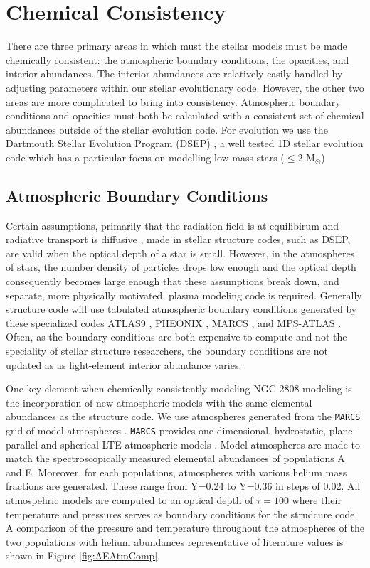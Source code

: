 \section{Chemical Consistency}\label{sec:const}
There are three primary areas in which must the stellar models must be made chemically
consistent: the atmospheric boundary conditions, the opacities, and interior
abundances. The interior abundances are relatively easily handled by adjusting
parameters within our stellar evolutionary code. However, the other two areas are
more complicated to bring into consistency. Atmospheric boundary conditions and
opacities must both be calculated with a consistent set of chemical abundances
outside of the stellar evolution code. For evolution we use the Dartmouth Stellar Evolution Program (DSEP) \citep{Dotter2008}, a well tested 1D stellar evolution code which has a particular focus on modelling low mass stars ($\le 2$ M$_{\odot}$)

\subsection{Atmospheric Boundary Conditions}\label{sec:atm}
Certain assumptions, primarily that the radiation field is at equilibirum and radiative transport is diffusive \citep{Salaris2005}, made in stellar structure
codes, such as DSEP, are valid when the optical depth of a star is small.
However, in the atmospheres of stars, the number density of particles drops low
enough and the optical depth consequently becomes large enough that these
assumptions break down, and separate, more physically motivated, plasma modeling code is required.
Generally structure code will use tabulated atmospheric boundary conditions
generated by these specialized codes ATLAS9 \citep{Kurucz1993}, PHEONIX \citep{Husser2013}, MARCS \citep{Gustafsson2008}, and MPS-ATLAS \citep{Kostogryz2023}. Often, as the boundary conditions are both expensive to compute
and not the speciality of stellar structure researchers, the boundary
conditions are not updated as as light-element interior abundance varies. 

One key element when chemically consistently modeling NGC 2808 modeling is the
incorporation of new atmospheric models with the same elemental abundances as
the structure code. We use atmospheres generated from the \texttt{MARCS} grid
of model atmospheres \citep{Plez2008}. \texttt{MARCS} provides one-dimensional,
hydrostatic, plane-parallel and spherical LTE atmospheric models
\citep{Gustafsson2008}. Model atmospheres are made to match the
spectroscopically measured elemental abundances of populations A and E.
Moreover, for each populations, atmospheres with  various helium mass fractions
are generated. These range from Y=0.24 to Y=0.36 in steps of 0.02. All
atmospehric models are computed to an optical depth of $\tau = 100$ where their
temperature and pressures serves as boundary conditions for the strudcure code.
A comparison of the pressure and temperature throughout the atmospheres of the
two populations with helium abundances representative of literature values is
shown
in Figure \ref{fig:AEAtmComp}.

